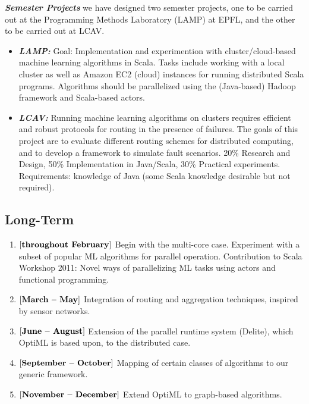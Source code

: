 \documentclass[acmtocl]{acmtrans2m}
\begin{document}
{\bf \em Semester Projects} we have designed two semester projects, one to be carried out at the Programming Methods Laboratory (LAMP) at EPFL, and the other to be carried out at LCAV.
\begin{itemize}
\item {\bf \em LAMP:} Goal: Implementation and experimention with cluster/cloud-based machine learning algorithms in Scala. Tasks include working with a local cluster as well as Amazon EC2 (cloud) instances for running distributed Scala programs. Algorithms should be parallelized using the (Java-based) Hadoop framework and Scala-based actors.
\item {\bf \em LCAV:} Running machine learning algorithms on clusters requires efficient and robust protocols for routing in the presence of failures. The goals of this project are to evaluate different routing schemes for distributed computing, and to develop a framework to simulate fault scenarios. 20\% Research and Design, 50\% Implementation in Java/Scala, 30\% Practical experiments. Requirements: knowledge of Java (some Scala knowledge desirable but not required).
\end{itemize}


\subsection{Long-Term}

\begin{enumerate}
\item $[\mbox{\bf throughout February}]$ Begin with the multi-core case. Experiment with a subset of popular ML algorithms for parallel operation. Contribution to Scala Workshop 2011: Novel ways of parallelizing ML tasks using actors and functional programming.

\item $[\mbox{\bf March -- May}]$ Integration of routing and aggregation techniques, inspired by sensor networks.

\item $[\mbox{\bf June -- August}]$ Extension of the parallel runtime system (Delite), which OptiML is based upon, to the distributed case.

\item $[\mbox{\bf September -- October}]$ Mapping of certain classes of algorithms to our generic framework.

\item $[\mbox{\bf November -- December}]$ Extend OptiML to graph-based algorithms.

\end{enumerate}
\end{document}
